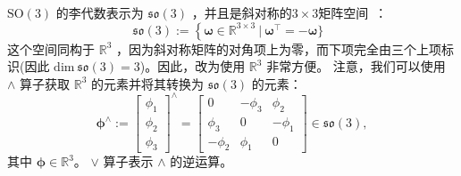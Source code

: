 $\mathrm{SO}(3)$ 的李代数表示为 $\mathfrak{so}(3)$ ，并且是斜对称的$3\times3$矩阵空间~\cite{chirikjian2011stochastic,tapp2016matrix}： 
\begin{equation}
    \mathfrak{so}(3) := \left\{ \boldsymbol{\omega} \in \mathbb{R}^{3 \times 3} ~| ~\boldsymbol{\omega}^\top = - \boldsymbol{\omega}\}\right.~~~
\end{equation}
这个空间同构于 $\mathbb{R}^3$ ，因为斜对称矩阵的对角项上为零，而下项完全由三个上项标识(因此 $\mathrm{dim}~\mathfrak{so}(3) = 3$)。因此，改为使用 $\mathbb{R}^3$ 非常方便。 
注意，我们可以使用 $\wedge$ 算子获取 $\mathbb{R}^3$ 的元素并将其转换为 $\mathfrak{so}(3)$ 的元素： 
\begin{equation}
    \boldsymbol{\phi}^\wedge := \left[ \begin{array}{c}
         \phi_{1} \\
         \phi_{2} \\
         \phi_{3}
    \end{array} \right]^\wedge = 
    \left[ \begin{array}{ccc}
        0 & -\phi_{3} & \phi_{2} \\
        \phi_{3} & 0 & -\phi_{1} \\
        -\phi_{2} & \phi_{1} & 0
    \end{array} \right] \in \mathfrak{so}(3),
\end{equation}
其中 $\boldsymbol{\phi} \in \mathbb{R}^3$。
$\vee$ 算子表示 $\wedge$ 的逆运算。 

